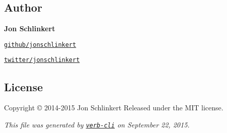 \subsection*{Author}

{\bfseries Jon Schlinkert}


\begin{DoxyItemize}
\item \href{https://github.com/jonschlinkert}{\tt github/jonschlinkert}
\item \href{http://twitter.com/jonschlinkert}{\tt twitter/jonschlinkert}
\end{DoxyItemize}

\subsection*{License}

Copyright © 2014-\/2015 Jon Schlinkert Released under the M\+IT license.





{\itshape This file was generated by \href{https://github.com/assemble/verb-cli}{\tt verb-\/cli} on September 22, 2015.} 